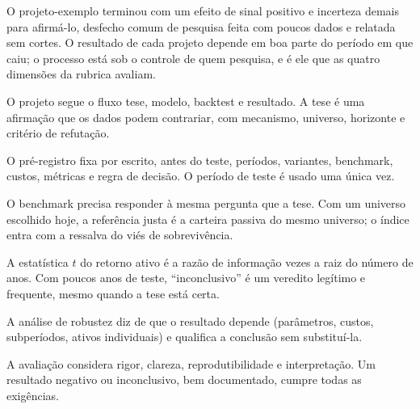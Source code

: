 O projeto-exemplo terminou com um efeito de sinal positivo e incerteza demais para afirmá-lo, desfecho comum de pesquisa feita com poucos dados e relatada sem cortes. O resultado de cada projeto depende em boa parte do período em que caiu; o processo está sob o controle de quem pesquisa, e é ele que as quatro dimensões da rubrica avaliam.

\begin{resumo}
  \item O projeto segue o fluxo tese, modelo, backtest e resultado. A tese é uma afirmação que os dados podem contrariar, com mecanismo, universo, horizonte e critério de refutação.
  \item O pré-registro fixa por escrito, antes do teste, períodos, variantes, benchmark, custos, métricas e regra de decisão. O período de teste é usado uma única vez.
  \item O benchmark precisa responder à mesma pergunta que a tese. Com um universo escolhido hoje, a referência justa é a carteira passiva do mesmo universo; o índice entra com a ressalva do viés de sobrevivência.
  \item A estatística $t$ do retorno ativo é a razão de informação vezes a raiz do número de anos. Com poucos anos de teste, ``inconclusivo'' é um veredito legítimo e frequente, mesmo quando a tese está certa.
  \item A análise de robustez diz de que o resultado depende (parâmetros, custos, subperíodos, ativos individuais) e qualifica a conclusão sem substituí-la.
  \item A avaliação considera rigor, clareza, reprodutibilidade e interpretação. Um resultado negativo ou inconclusivo, bem documentado, cumpre todas as exigências.
\end{resumo}

